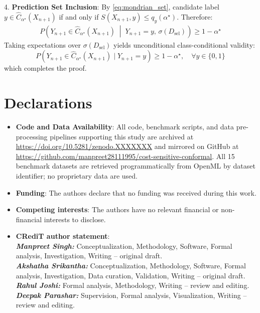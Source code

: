\documentclass{ieeetj}
\begin{document}
\begin{IEEEproof}
4. \textbf{Prediction Set Inclusion}: By \eqref{eq:mondrian_set}, candidate label $y \in \hat{C}_{\alpha^\star}(X_{n+1})$ if and only if $S(X_{n+1}, y) \le q_y(\alpha^\star)$. Therefore:
\begin{align}
P\left(Y_{n+1} \in \hat{C}_{\alpha^\star}(X_{n+1}) \;\middle|\; Y_{n+1}=y, \, \sigma(D_{\mathrm{sel}})\right) \ge 1 - \alpha^\star
\end{align}
Taking expectations over $\sigma(D_{\mathrm{sel}})$ yields unconditional class-conditional validity:
\begin{equation}
P(Y_{n+1} \in \hat{C}_{\alpha^\star}(X_{n+1}) \mid Y_{n+1}=y) \ge 1 - \alpha^\star, \quad \forall y \in \{0, 1\}
\end{equation}
which completes the proof.
\end{IEEEproof}

\section*{Declarations}
\begin{itemize}
    \item \textbf{Code and Data Availability}: All code, benchmark scripts, and data pre-processing pipelines supporting this study are archived at \url{https://doi.org/10.5281/zenodo.XXXXXXX} and mirrored on GitHub at \url{https://github.com/manpreet28111995/cost-sensitive-conformal}. All 15 benchmark datasets are retrieved programmatically from OpenML by dataset identifier; no proprietary data are used.
    \item \textbf{Funding}: The authors declare that no funding was received during this work.
    \item \textbf{Competing interests}: The authors have no relevant financial or non-financial interests to disclose.
    \item \textbf{CRediT author statement}: \\
    \textit{\textbf{Manpreet Singh:}} Conceptualization, Methodology, Software, Formal analysis, Investigation, Writing -- original draft. \\
    \textit{\textbf{Akshatha Srikantha:}} Conceptualization, Methodology, Software, Formal analysis, Investigation, Data curation, Validation, Writing -- original draft. \\
    \textit{\textbf{Rahul Joshi:}} Formal analysis, Methodology, Writing -- review and editing. \\
    \textit{\textbf{Deepak Parashar:}} Supervision, Formal analysis, Visualization, Writing -- review and editing.
\end{itemize}
\end{document}
